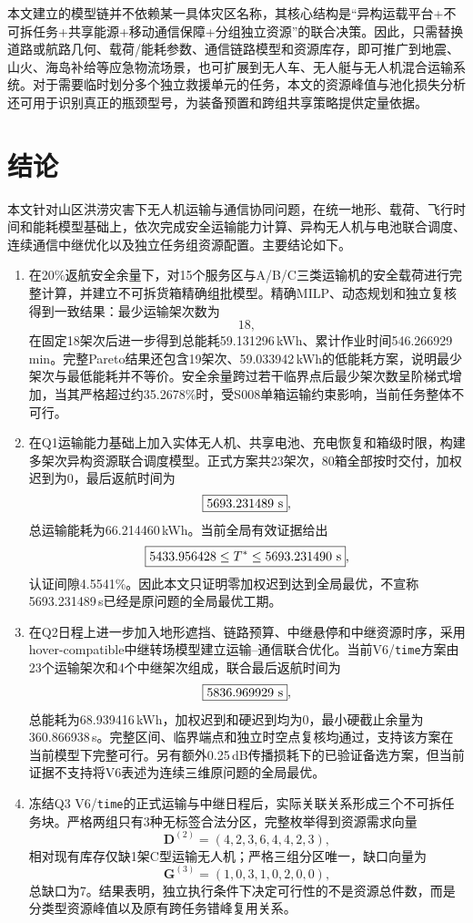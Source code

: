 \documentclass[UTF8,a4paper,12pt]{ctexart}
\begin{document}
本文建立的模型链并不依赖某一具体灾区名称，其核心结构是“异构运载平台+不可拆任务+共享能源+移动通信保障+分组独立资源”的联合决策。因此，只需替换道路或航路几何、载荷/能耗参数、通信链路模型和资源库存，即可推广到地震、山火、海岛补给等应急物流场景，也可扩展到无人车、无人艇与无人机混合运输系统。对于需要临时划分多个独立救援单元的任务，本文的资源峰值与池化损失分析还可用于识别真正的瓶颈型号，为装备预置和跨组共享策略提供定量依据。



\section{结论}
\label{sec:conclusion}

本文针对山区洪涝灾害下无人机运输与通信协同问题，在统一地形、载荷、飞行时间和能耗模型基础上，依次完成安全运输能力计算、异构无人机与电池联合调度、连续通信中继优化以及独立任务组资源配置。主要结论如下。

\begin{enumerate}
\item[\textbf{问题一：}] 在20\%返航安全余量下，对15个服务区与A/B/C三类运输机的安全载荷进行完整计算，并建立不可拆货箱精确组批模型。精确MILP、动态规划和独立复核得到一致结果：最少运输架次数为
\[
\boxed{18},
\]
在固定18架次后进一步得到总能耗59.131296\,kWh、累计作业时间546.266929\,min。完整Pareto结果还包含19架次、59.033942\,kWh的低能耗方案，说明最少架次与最低能耗并不等价。安全余量跨过若干临界点后最少架次数呈阶梯式增加，当其严格超过约35.2678\%时，受S008单箱运输约束影响，当前任务整体不可行。

\item[\textbf{问题二：}] 在Q1运输能力基础上加入实体无人机、共享电池、充电恢复和箱级时限，构建多架次异构资源联合调度模型。正式方案共23架次，80箱全部按时交付，加权迟到为0，最后返航时间为
\[
\boxed{5693.231489\ {\rm s}},
\]
总运输能耗为66.214460\,kWh。当前全局有效证据给出
\[
\boxed{5433.956428\le T^*\le5693.231490\ {\rm s}},
\]
认证间隙4.5541\%。因此本文只证明零加权迟到达到全局最优，不宣称5693.231489\,s已经是原问题的全局最优工期。

\item[\textbf{问题三：}] 在Q2日程上进一步加入地形遮挡、链路预算、中继悬停和中继资源时序，采用hover-compatible中继转场模型建立运输--通信联合优化。当前V6/\texttt{time}方案由23个运输架次和4个中继架次组成，联合最后返航时间为
\[
\boxed{5836.969929\ {\rm s}},
\]
总能耗为68.939416\,kWh，加权迟到和硬迟到均为0，最小硬截止余量为360.866938\,s。完整区间、临界端点和独立时空点复核均通过，支持该方案在当前模型下完整可行。另有额外0.25\,dB传播损耗下的已验证备选方案，但当前证据不支持将V6表述为连续三维原问题的全局最优。

\item[\textbf{问题四：}] 冻结Q3 V6/\texttt{time}的正式运输与中继日程后，实际关联关系形成三个不可拆任务块。严格两组只有3种无标签合法分区，完整枚举得到资源需求向量
\[
\mathbf D^{(2)}=(4,2,3,6,4,4,2,3),
\]
相对现有库存仅缺1架C型运输无人机；严格三组分区唯一，缺口向量为
\[
\boxed{\mathbf G^{(3)}=(1,0,3,1,0,2,0,0)},
\]
总缺口为7。结果表明，独立执行条件下决定可行性的不是资源总件数，而是分类型资源峰值以及原有跨任务错峰复用关系。
\end{enumerate}
\end{document}
